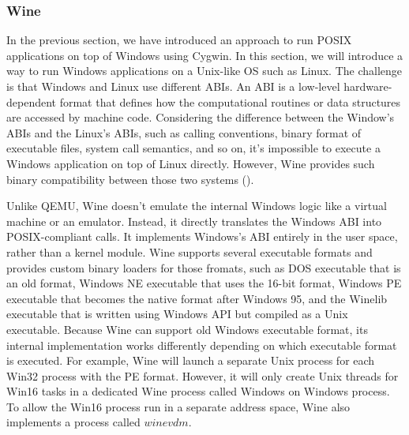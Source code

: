 \subsubsection{Wine}



In the previous section, we have introduced an approach to run POSIX applications on top of Windows using Cygwin. In this section, we will introduce a way to run Windows applications on a Unix-like OS such as Linux. The challenge is that Windows and Linux use different ABIs. An ABI is a low-level hardware-dependent format that defines how the computational routines or data structures are accessed by machine code. Considering the difference between the Window's ABIs and the Linux's ABIs, such as calling conventions, binary format of executable files, system call semantics, and so on, it's impossible to execute a Windows application on top of Linux directly. However, Wine provides such binary compatibility between those two systems (\cite{enwikiWine}).      

Unlike QEMU, Wine doesn't emulate the internal Windows logic like a virtual machine or an emulator. Instead, it directly translates the Windows ABI into POSIX-compliant calls. It implements Windows's ABI entirely in the user space, rather than a kernel module. Wine supports several executable formats and provides custom binary loaders for those fromats, such as DOS executable that is an old format, Windows NE executable that uses the 16-bit format, Windows PE executable that becomes the native format after Windows 95, and the Winelib executable that is written using Windows API but compiled as a Unix executable. Because Wine can support old Windows executable format, its internal implementation works differently depending on which executable format is executed. For example, Wine will launch a separate Unix process for each Win32 process with the PE format. However, it will only create Unix threads for Win16 tasks in a dedicated Wine process called Windows on Windows process. To allow the Win16 process run in a separate address space, Wine also implements a process called $winevdm$.  

